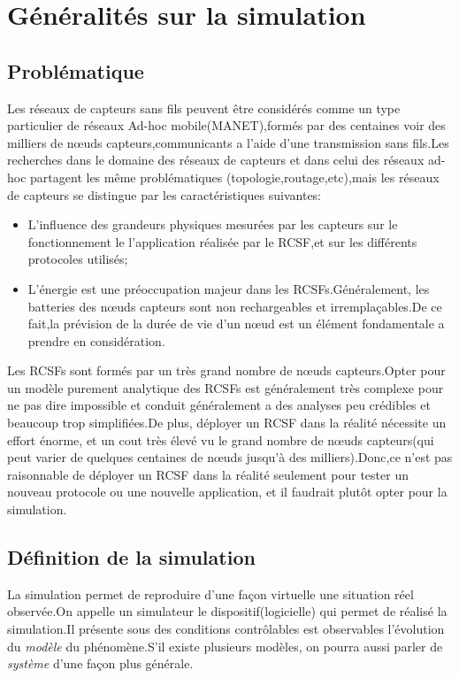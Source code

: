 
\chapter{Généralités sur la simulation}
\section{Problématique}
Les réseaux de capteurs sans fils peuvent être considérés comme un type particulier de réseaux Ad-hoc mobile(MANET),formés par des  centaines voir des milliers de nœuds capteurs,communicants a l'aide d'une transmission sans fils.Les recherches dans le domaine des réseaux de capteurs et dans celui des réseaux ad-hoc partagent les même problématiques (topologie,routage,etc),mais les réseaux de capteurs se distingue par les caractéristiques suivantes:
\begin{itemize}
\item L'influence des grandeurs physiques mesurées par les capteurs sur le fonctionnement le l'application réalisée par le RCSF,et sur les différents protocoles utilisés; 
\item L'énergie est une préoccupation majeur dans les RCSFs.Généralement, les batteries des nœuds capteurs sont non rechargeables et irremplaçables.De ce fait,la prévision de la durée de vie d'un nœud est un élément fondamentale a prendre en considération.
\end{itemize}

Les RCSFs sont formés par un très grand nombre de nœuds capteurs.Opter pour un modèle
 purement analytique des RCSFs est généralement très complexe pour ne pas dire impossible et conduit généralement a des analyses peu crédibles et beaucoup trop simplifiées.De plus, déployer un RCSF dans la réalité nécessite un effort énorme, et un cout très élevé vu le grand nombre de nœuds capteurs(qui peut varier de quelques centaines de nœuds jusqu'à des milliers).Donc,ce n'est pas raisonnable de déployer un RCSF dans la réalité seulement pour tester un nouveau protocole ou une nouvelle application, et il faudrait plutôt opter pour la simulation.   
 
\section{Définition de la simulation }
La simulation permet de reproduire d'une façon virtuelle une situation réel observée.On appelle un simulateur le dispositif(logicielle) qui permet de réalisé la simulation.Il présente sous des conditions contrôlables est observables l'évolution du \emph{modèle} du phénomène.S'il existe plusieurs modèles, on pourra aussi parler de \emph{système} d'une façon plus générale.

